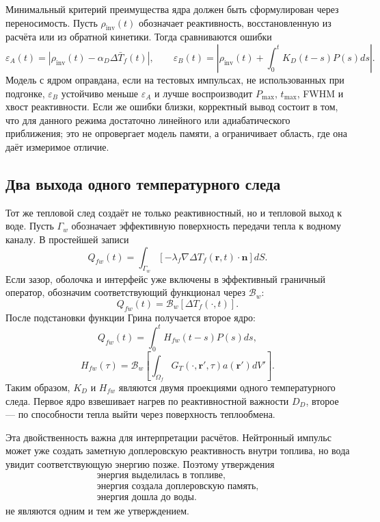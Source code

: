 \documentclass[12pt]{article}
\begin{document}
Минимальный критерий преимущества ядра должен быть сформулирован через переносимость. Пусть \(\rho_{\mathrm{inv}}(t)\) обозначает реактивность, восстановленную из расчёта или из обратной кинетики. Тогда сравниваются ошибки
\[
\varepsilon_A(t)
=
\left|
\rho_{\mathrm{inv}}(t)-\alpha_D\Delta\bar T_f(t)
\right|,
\qquad
\varepsilon_B(t)
=
\left|
\rho_{\mathrm{inv}}(t)+\int_0^tK_D(t-s)P(s)ds
\right|.
\]
Модель с ядром оправдана, если на тестовых импульсах, не использованных при подгонке, \(\varepsilon_B\) устойчиво меньше \(\varepsilon_A\) и лучше воспроизводит \(P_{\max}\), \(t_{\max}\), FWHM и хвост реактивности. Если же ошибки близки, корректный вывод состоит в том, что для данного режима достаточно линейного или адиабатического приближения; это не опровергает модель памяти, а ограничивает область, где она даёт измеримое отличие.

\subsection{Два выхода одного температурного следа}

Тот же тепловой след создаёт не только реактивностный, но и тепловой выход к воде. Пусть \(\Gamma_w\) обозначает эффективную поверхность передачи тепла к водному каналу. В простейшей записи
\[
Q_{fw}(t)
=
\int_{\Gamma_w}
\left[-\lambda_f\nabla\Delta T_f(\mathbf r,t)\cdot\mathbf n\right]dS.
\]
Если зазор, оболочка и интерфейс уже включены в эффективный граничный оператор, обозначим соответствующий функционал через \(\mathcal B_w\):
\[
Q_{fw}(t)=\mathcal B_w[\Delta T_f(\cdot,t)].
\]
После подстановки функции Грина получается второе ядро:
\[
Q_{fw}(t)=\int_0^tH_{fw}(t-s)P(s)ds,
\]
\[
\boxed{
H_{fw}(\tau)
=
\mathcal B_w\left[
\int_{\Omega_f}G_T(\cdot,\mathbf r',\tau)a(\mathbf r')dV'
\right].
}
\]
Таким образом, \(K_D\) и \(H_{fw}\) являются двумя проекциями одного температурного следа. Первое ядро взвешивает нагрев по реактивностной важности \(D_D\), второе --- по способности тепла выйти через поверхность теплообмена.

Эта двойственность важна для интерпретации расчётов. Нейтронный импульс может уже создать заметную доплеровскую реактивность внутри топлива, но вода увидит соответствующую энергию позже. Поэтому утверждения
\[
\begin{gathered}
\text{энергия выделилась в топливе},\\
\text{энергия создала доплеровскую память},\\
\text{энергия дошла до воды}.
\end{gathered}
\]
не являются одним и тем же утверждением.
\end{document}
